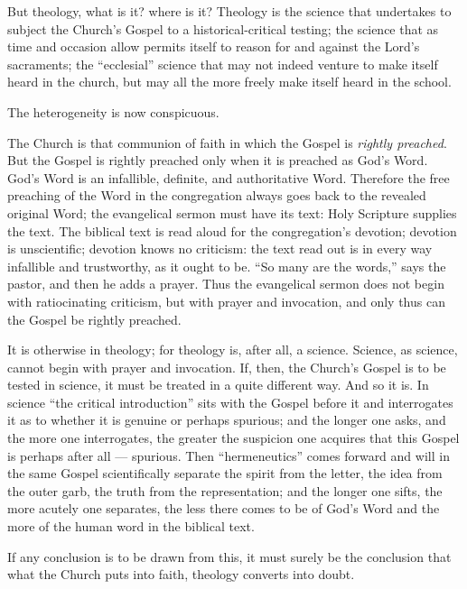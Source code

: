 \documentclass[12pt,a4paper]{book}
\begin{document}
But theology, what is it? where is it? Theology is the science that undertakes
to subject the Church's Gospel to a historical-critical testing; the science
that as time and occasion allow permits itself to reason for and against the
Lord's sacraments; the ``ecclesial'' science that may not indeed venture to
make itself heard in the church, but may all the more freely make itself heard
in the school.

The heterogeneity is now conspicuous.

The Church is that communion of faith in which the Gospel is \emph{rightly
preached}. But the Gospel is rightly preached only when it is preached as God's
Word. God's Word is an infallible, definite, and authoritative Word. Therefore
the free preaching of the Word in the congregation always goes back to the
revealed original Word; the evangelical sermon must have its text: Holy
Scripture supplies the text. The biblical text is read aloud for the
congregation's devotion; devotion is unscientific; devotion knows no criticism:
the text read out is in every way infallible and trustworthy, as it ought to
be. ``So many are the words,'' says the pastor, and then he adds a prayer. Thus
the evangelical
sermon does not begin with ratiocinating criticism, but with prayer and
invocation, and only thus can the Gospel be rightly preached.

It is otherwise in theology; for theology is, after all, a science. Science, as
science, cannot begin with prayer and invocation. If, then, the Church's Gospel
is to be tested in science, it must be treated in a quite different way. And so
it is. In science ``the critical introduction'' sits with the Gospel before it
and interrogates it as to whether it is genuine or perhaps spurious; and the
longer one asks, and the more one interrogates, the greater the suspicion one
acquires that this Gospel is perhaps after all --- spurious. Then
``hermeneutics'' comes forward and will in the same Gospel scientifically
separate the spirit from the letter, the idea from the outer garb, the truth
from the representation; and the longer one sifts, the more acutely one
separates, the less there comes to be of God's Word and the more of the human
word in the biblical text.

If any conclusion is to be drawn from this, it must surely be the conclusion
that what the Church puts into faith, theology converts into doubt.
\end{document}
